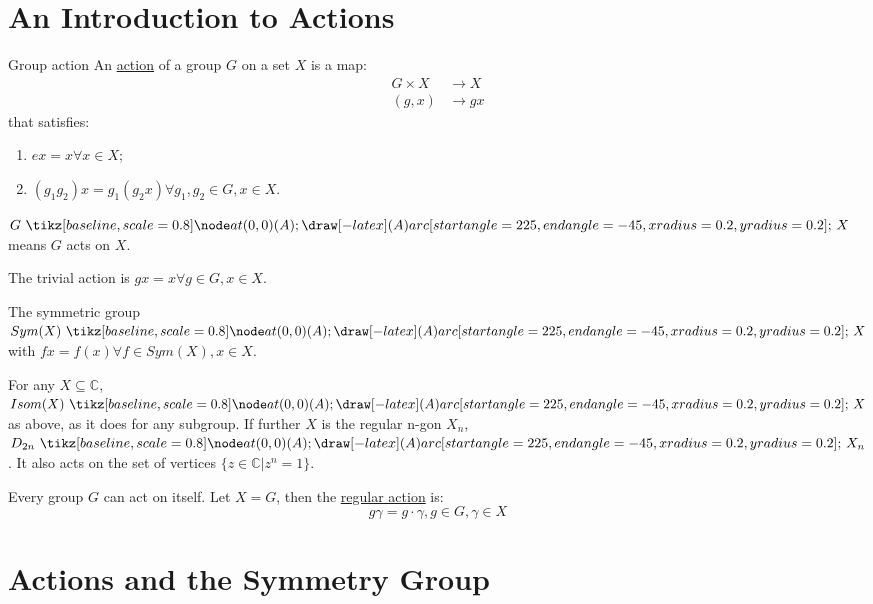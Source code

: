 \documentclass[../Main.tex]{subfiles}
\begin{document}
\section{An Introduction to Actions}
\begin{definition}{Group action}
    An \underline{action} of a group $G$ on a set $X$ is a map:
    \begin{align*}
        G \times X &\rightarrow X \\
        (g, x) &\rightarrow gx
    \end{align*}
    that satisfies:
    \begin{enumerate}
        \item $ex = x \forall x \in X$;\label{actAxiomIdentity}
        \item $(g_1 g_2)x = g_1(g_2 x) \forall g_1, g_2 \in G, x \in X$.\label{actAxiomAssoc}
    \end{enumerate}
\end{definition}
$G \actson X$ means $G$ acts on $X$.\par
The trivial action is $gx=x \forall g \in G, x \in X$.\par
The symmetric group $Sym(X) \actson X$ with $fx=f(x) \forall f \in Sym(X), x \in X$.\par
For any $X \subseteq \mathbb{C}$, $Isom(X) \actson X$ as above, as it does for any subgroup. If further $X$ is the regular n-gon $X_n$, $D_{2n} \actson X_n$. It also acts on the set of vertices $\{z \in \mathbb{C} | z^n = 1\}$.\par
Every group $G$ can act on itself. Let $X = G$, then the \underline{regular action} is:
\begin{equation*}
    g \gamma = g \cdot \gamma, g \in G, \gamma \in X
\end{equation*}
\section{Actions and the Symmetry Group}
\end{document}
